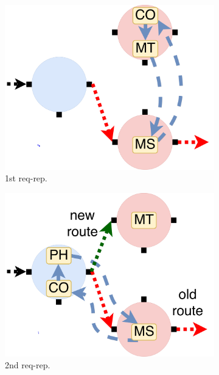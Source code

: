 \begin{figure}[!h]
\begin{subfigure}[t]{0.33\linewidth}
   \centering
   \includegraphics[width=\columnwidth]{figure/nfactor-mig1.pdf}
   \caption{1st req-rep.}\label{fig:mig1}
  \end{subfigure}\hfill
  \begin{subfigure}[t]{0.33\linewidth}
     \centering
     \includegraphics[width=\columnwidth]{figure/nfactor-mig2.pdf}
     \caption{2nd req-rep.}\label{fig:mig2}
    \end{subfigure}\hfill
  \begin{subfigure}[t]{0.33\linewidth}

\end{subfigure}
\end{figure}
